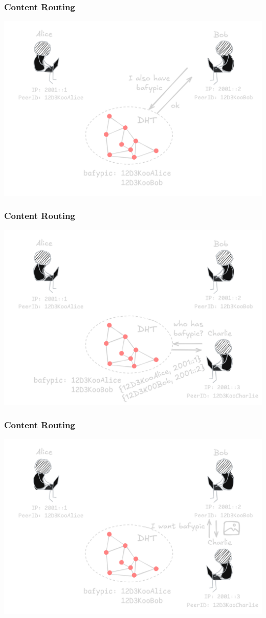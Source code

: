 \documentclass{../shipyard-slide}
\begin{document}
\begin{frame}
  \frametitle{Content Routing}
  \begin{center}
    \includegraphics[width=.7\textwidth]{resources/routing-provide-bob.png}
  \end{center}
\end{frame}
\begin{frame}
  \frametitle{Content Routing}
  \begin{center}
    \includegraphics[width=.7\textwidth]{resources/routing-lookup-charlie.png}
  \end{center}
\end{frame}
\begin{frame}
  \frametitle{Content Routing}
  \begin{center}
    \includegraphics[width=.7\textwidth]{resources/routing-transfer-charlie.png}
  \end{center}
\end{frame}
\end{document}
